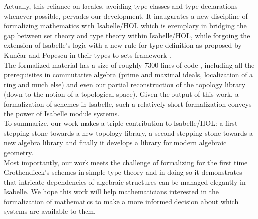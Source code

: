 \documentclass[12pt]{scrartcl}
\begin{document}
Actually, this reliance on locales, avoiding type classes and type declarations whenever possible, pervades our development. It inaugurates a new discipline of formalizing mathematics with Isabelle/HOL which is exemplary in bridging the gap between set theory and type theory within Isabelle/HOL, while forgoing the extension of Isabelle's logic with a new rule for type definition as proposed by Kun\v{c}ar and Popescu in their types-to-sets framework \cite{typestosets}. \\
The formalized material has a size of roughly 7300 lines of code \cite{Grothendieck_Schemes-AFP}, including all the prerequisites in commutative  algebra (prime and maximal ideals, localization of a ring and much else) and even our partial reconstruction of the topology library (down to the notion of a topological space). Given the output of this work, a formalization of schemes in Isabelle, such a relatively short formalization conveys the power of Isabelle module systems. \\
To summarize, our work makes a triple contribution to Isabelle/HOL: a first stepping stone towards a new topology library, a second stepping stone towards a new algebra library and finally it develops a library for modern algebraic geometry. \\
Most importantly, our work meets the challenge of formalizing for the first time Grothendieck's schemes in simple type theory and in doing so it demonstrates that intricate dependencies of algebraic structures can be managed elegantly in Isabelle. We hope this work will help mathematicians interested in the formalization of mathematics to make a more informed decision about which systems are available to them.
\end{document}
